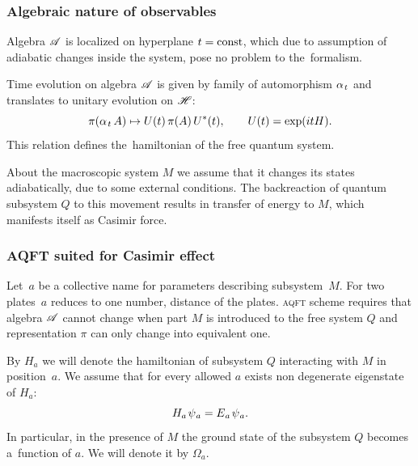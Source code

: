 \documentclass[10pt,t]{beamer}
\begin{document}
\begin{frame}
  \frametitle{Algebraic nature of observables}


  Algebra $\mathcal{A}$ is localized on hyperplane $t = \textrm{const}$, which due to
  assumption of adiabatic changes inside the system, pose no problem to
  the~formalism.

  Time evolution on algebra $\mathcal{A}$ is given by family of automorphism
  $\alpha_{ \hspace{0.09em} t }$ and translates to unitary evolution on $\mathcal{H}$:
  \begin{equation}
    \label{eq:Overview-of-Herdegens-approach-ETC-02}
    \pi( \alpha_{ \hspace{0.09em} t } \, A ) \mapsto U( t ) \, \pi( A ) \, U^{ * }( t ), \qquad
    U( t ) = \exp( i t H ).
  \end{equation}
  This relation defines the~hamiltonian of the free quantum system.

  About the macroscopic system $M$ we assume that it changes its states
  adiabatically, due to some external conditions. The backreaction of
  quantum subsystem $Q$ to this movement results in transfer of energy to
  $M$, which manifests itself as Casimir force.

\end{frame}





\begin{frame}
  \frametitle{AQFT suited for Casimir effect}


  Let~$a$ be a collective name for parameters describing subsystem~$M$.
  For two plates~$a$ reduces to one number, distance of the plates.
  \textsc{aqft} scheme requires that algebra $\mathcal{A}$ cannot change when
  part $M$ is introduced to the free system $Q$ and representation $\pi$
  can only change into equivalent one.

  By $H_{ a }$ we will denote the hamiltonian of subsystem $Q$ interacting
  with $M$ in position~$a$. We assume that for every allowed $a$ exists
  non degenerate eigenstate of $H_{ a }$:
  \begin{equation}
    \label{eq:Overview-of-Herdegens-approach-ETC-03}
    H_{ a } \hspace{0.11em} \psi_{ \hspace{0.05em} a } =
    E_{ \hspace{0.05em} a } \hspace{0.11em} \psi_{ \hspace{0.05em} a }.
  \end{equation}
  In particular, in the presence of $M$ the ground state of the subsystem
  $Q$ becomes a~function of $a$. We will denote it by $\Omega_{ a }$.

\end{frame}
\end{document}
